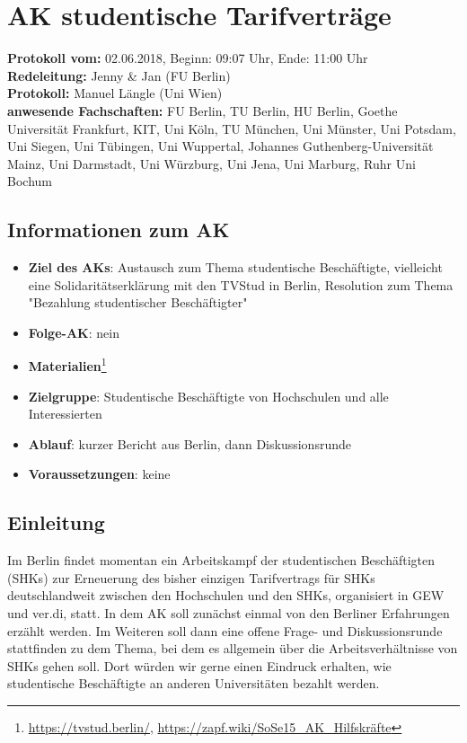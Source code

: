 
\section{AK studentische Tarifverträge}

	\textbf{Protokoll vom:} 02.06.2018,
	Beginn: 09:07 Uhr,
	Ende: 11:00 Uhr \\
	\textbf{Redeleitung:} Jenny \& Jan (FU Berlin) \\
	\textbf{Protokoll:} Manuel Längle (Uni Wien) \\
	\textbf{anwesende Fachschaften:} FU Berlin, TU Berlin, HU Berlin, Goethe Universität Frankfurt, KIT, Uni Köln, TU München, Uni Münster, Uni Potsdam, Uni Siegen, Uni Tübingen, Uni Wuppertal, Johannes Guthenberg-Universität Mainz, Uni Darmstadt, Uni Würzburg, Uni Jena, Uni Marburg, Ruhr Uni Bochum

	\subsection*{Informationen zum AK}
		\begin{itemize}
			\item \textbf{Ziel des AKs}: Austausch zum Thema studentische Beschäftigte, vielleicht eine Solidaritätserklärung mit den TVStud in Berlin, Resolution zum Thema "Bezahlung studentischer Beschäftigter"
			\item \textbf{Folge-AK}: nein
      \item \textbf{Materialien}\footnote{\url{https://tvstud.berlin/}, \url{https://zapf.wiki/SoSe15_AK_Hilfskräfte}}
			\item \textbf{Zielgruppe}: Studentische Beschäftigte von Hochschulen und alle Interessierten
			\item \textbf{Ablauf}: kurzer Bericht aus Berlin, dann Diskussionsrunde
			\item \textbf{Voraussetzungen}: keine
		\end{itemize}

  \subsection*{Einleitung}
    Im Berlin findet momentan ein Arbeitskampf der studentischen Beschäftigten (SHKs) zur Erneuerung des bisher einzigen Tarifvertrags für SHKs deutschlandweit zwischen den Hochschulen und den SHKs, organisiert in GEW und ver.di, statt. In dem AK soll zunächst einmal von den Berliner Erfahrungen erzählt werden. Im Weiteren soll dann eine offene Frage- und Diskussionsrunde stattfinden zu dem Thema, bei dem es allgemein über die Arbeitsverhältnisse von SHKs gehen soll. Dort würden wir gerne einen Eindruck erhalten, wie studentische Beschäftigte an anderen Universitäten bezahlt werden.


